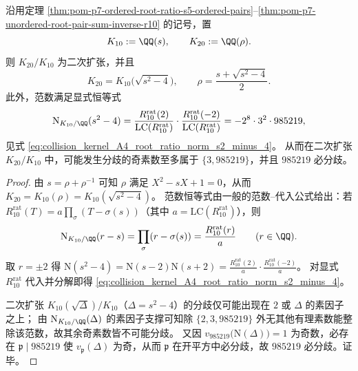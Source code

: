 \begin{proposition}[有序/无序根对塔的相对二次扩张与唯一奇素分歧]\label{prop:pom-p7-root-ratio-quadratic-tower-ramification}
沿用定理 \ref{thm:pom-p7-ordered-root-ratio-s5-ordered-pairs}--\ref{thm:pom-p7-unordered-root-pair-sum-inverse-r10} 的记号，置
\[
K_{10}:=\QQ(s),\qquad K_{20}:=\QQ(\rho).
\]
则 \(K_{20}/K_{10}\) 为二次扩张，并且
\[
K_{20}=K_{10}\bigl(\sqrt{s^2-4}\bigr),\qquad
\rho=\frac{s+\sqrt{s^2-4}}{2}.
\]
此外，范数满足显式恒等式
\[
\mathrm N_{K_{10}/\QQ}(s^2-4)
=\frac{R_{10}^{\mathrm{rat}}(2)}{\mathrm{LC}(R_{10}^{\mathrm{rat}})}\cdot
\frac{R_{10}^{\mathrm{rat}}(-2)}{\mathrm{LC}(R_{10}^{\mathrm{rat}})}
=-2^8\cdot 3^2\cdot 985219,
\]
见式 \eqref{eq:collision_kernel_A4_root_ratio_norm_s2_minus_4}。
从而在二次扩张 \(K_{20}/K_{10}\) 中，可能发生分歧的奇素数至多属于 \(\{3,985219\}\)，并且 \(985219\) 必分歧。
\end{proposition}



\begin{proof}
由 \(s=\rho+\rho^{-1}\) 可知 \(\rho\) 满足 \(X^2-sX+1=0\)，从而
\(
K_{20}=K_{10}(\rho)=K_{10}(\sqrt{s^2-4})
\)。
范数恒等式由一般的范数--代入公式给出：若 \(R_{10}^{\mathrm{rat}}(T)=a\prod_{\sigma}(T-\sigma(s))\)（其中 \(a=\mathrm{LC}(R_{10}^{\mathrm{rat}})\)），则
\[
\mathrm N_{K_{10}/\QQ}(r-s)=\prod_{\sigma}(r-\sigma(s))=\frac{R_{10}^{\mathrm{rat}}(r)}{a}\qquad(r\in\QQ).
\]
取 \(r=\pm 2\) 得
\(
\mathrm N(s^2-4)=\mathrm N(s-2)\mathrm N(s+2)=\frac{R_{10}^{\mathrm{rat}}(2)}{a}\cdot\frac{R_{10}^{\mathrm{rat}}(-2)}{a}
\)。
对显式 \(R_{10}^{\mathrm{rat}}\) 代入并分解即得 \eqref{eq:collision_kernel_A4_root_ratio_norm_s2_minus_4}。
\par
二次扩张 \(K_{10}(\sqrt{\Delta})/K_{10}\)（\(\Delta=s^2-4\)）的分歧仅可能出现在 \(2\) 或 \(\Delta\) 的素因子之上；
由 \(\mathrm N_{K_{10}/\QQ}(\Delta)\) 的素因子支撑可知除 \(\{2,3,985219\}\) 外无其他有理素数能整除该范数，故其余奇素数皆不可能分歧。
又因 \(v_{985219}\bigl(\mathrm N(\Delta)\bigr)=1\) 为奇数，必存在 \(\mathfrak p\mid 985219\) 使 \(v_{\mathfrak p}(\Delta)\) 为奇，从而 \(\mathfrak p\) 在开平方中必分歧，故 \(985219\) 必分歧。证毕。
\end{proof}

\endinput
